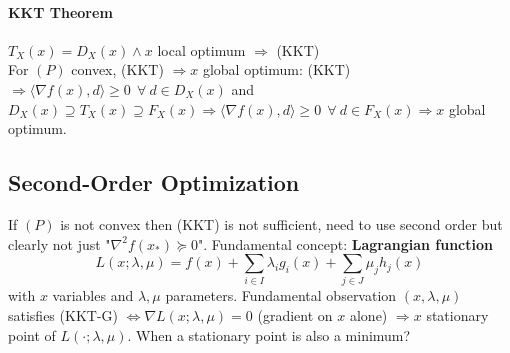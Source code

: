 \documentclass[10pt]{report}
\begin{document}
\paragraph{KKT Theorem} $T_X(x)=D_X(x)\wedge x$ local optimum $\Rightarrow$ (KKT)\\
For $(P)$ convex, (KKT) $\Rightarrow x$ global optimum: (KKT) $\Rightarrow \langle \nabla f(x), d\rangle \geq 0\:\:\forall\:d\in D_X(x)$ and $D_X(x)\supseteq T_X(x)\supseteq F_X(x) \Rightarrow\langle \nabla f(x), d\rangle \geq 0\:\:\forall\:d\in F_X(x)\Rightarrow x$ global optimum.
\subsection{Second-Order Optimization}
If $(P)$ is not convex then (KKT) is not sufficient, need to use second order but clearly not just "$\nabla^2 f(x_*)\succeq 0$". Fundamental concept: \textbf{Lagrangian function} $$L(x;\lambda, \mu)=f(x) + \sum_{i\in I} \lambda_ig_i(x) + \sum_{j\in J}\mu_jh_j(x)$$ with $x$ variables and $\lambda,\mu$ parameters. Fundamental observation $(x,\lambda,\mu)$ satisfies (KKT-G) $\Leftrightarrow \nabla L(x;\lambda,\mu) = 0$ (gradient on $x$ alone) $\Rightarrow x$ stationary point of $L(\cdot;\lambda,\mu)$. When a stationary point is also a minimum?
\end{document}
